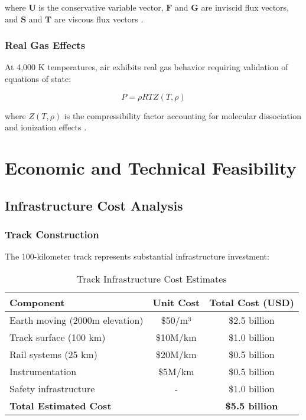 \documentclass[12pt,a4paper]{article}
\begin{document}
where $\mathbf{U}$ is the conservative variable vector, $\mathbf{F}$ and $\mathbf{G}$ are inviscid flux vectors, and $\mathbf{S}$ and $\mathbf{T}$ are viscous flux vectors \cite{blazek2001computational}.

\subsubsection{Real Gas Effects}
At 4,000 K temperatures, air exhibits real gas behavior requiring validation of equations of state:

\begin{equation}
P = \rho R T Z(T,\rho)
\label{eq:real_gas}
\end{equation}

where $Z(T,\rho)$ is the compressibility factor accounting for molecular dissociation and ionization effects \cite{park1990nonequilibrium}.

\section{Economic and Technical Feasibility}

\subsection{Infrastructure Cost Analysis}

\subsubsection{Track Construction}
The 100-kilometer track represents substantial infrastructure investment:

\begin{table}[H]
\centering
\caption{Track Infrastructure Cost Estimates}
\label{tab:cost_estimates}
\begin{tabular}{lcc}
\toprule
Component & Unit Cost & Total Cost (USD) \\
\midrule
Earth moving (2000m elevation) & \$50/m³ & \$2.5 billion \\
Track surface (100 km) & \$10M/km & \$1.0 billion \\
Rail systems (25 km) & \$20M/km & \$0.5 billion \\
Instrumentation & \$5M/km & \$0.5 billion \\
Safety infrastructure & - & \$1.0 billion \\
\midrule
\textbf{Total Estimated Cost} & & \textbf{\$5.5 billion} \\
\bottomrule
\end{tabular}
\end{table}
\end{document}
